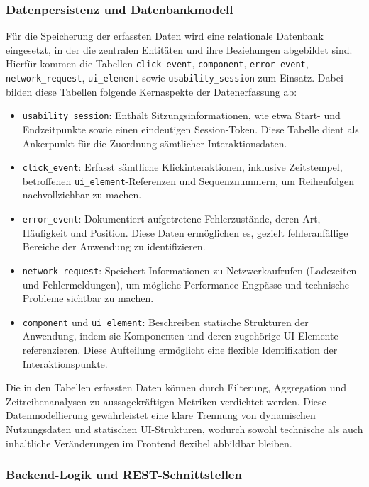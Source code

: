 \documentclass[12pt,oneside]{article}
\begin{document}
\subsubsection{Datenpersistenz und Datenbankmodell}

Für die Speicherung der erfassten Daten wird eine relationale Datenbank eingesetzt, in der die zentralen Entitäten und ihre Beziehungen abgebildet sind. Hierfür kommen die Tabellen \texttt{click\_event}, \texttt{component}, \texttt{error\_event}, \texttt{network\_request}, \texttt{ui\_element} sowie \texttt{usability\_session} zum Einsatz. Dabei bilden diese Tabellen folgende Kernaspekte der Datenerfassung ab:

\begin{itemize}
    \item \texttt{usability\_session}: Enthält Sitzungsinformationen, wie etwa Start- und Endzeitpunkte sowie einen eindeutigen Session-Token. Diese Tabelle dient als Ankerpunkt für die Zuordnung sämtlicher Interaktionsdaten.
    \item \texttt{click\_event}: Erfasst sämtliche Klickinteraktionen, inklusive Zeitstempel, betroffenen \texttt{ui\_element}-Referenzen und Sequenznummern, um Reihenfolgen nachvollziehbar zu machen.
    \item \texttt{error\_event}: Dokumentiert aufgetretene Fehlerzustände, deren Art, Häufigkeit und Position. Diese Daten ermöglichen es, gezielt fehleranfällige Bereiche der Anwendung zu identifizieren.
    \item \texttt{network\_request}: Speichert Informationen zu Netzwerkaufrufen (Ladezeiten und Fehlermeldungen), um mögliche Performance-Engpässe und technische Probleme sichtbar zu machen.
    \item \texttt{component} und \texttt{ui\_element}: Beschreiben statische Strukturen der Anwendung, indem sie Komponenten und deren zugehörige UI-Elemente referenzieren. Diese Aufteilung ermöglicht eine flexible Identifikation der Interaktionspunkte.
\end{itemize}

Die in den Tabellen erfassten Daten können durch Filterung, Aggregation und Zeitreihenanalysen zu aussagekräftigen Metriken verdichtet werden. Diese Datenmodellierung gewährleistet eine klare Trennung von dynamischen Nutzungsdaten und statischen UI-Strukturen, wodurch sowohl technische als auch inhaltliche Veränderungen im Frontend flexibel abbildbar bleiben.

\subsubsection{Backend-Logik und REST-Schnittstellen}
\end{document}
